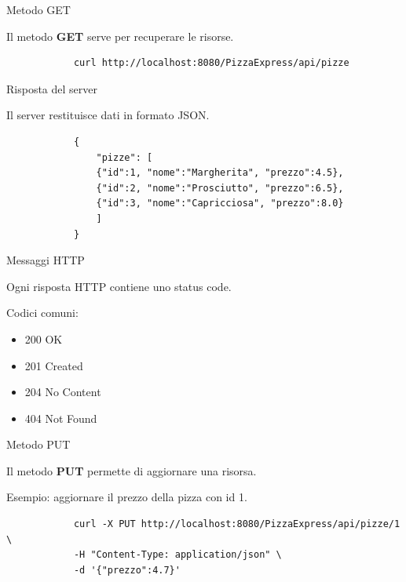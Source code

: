 \documentclass{beamer}
\begin{document}
	\begin{frame}[fragile]{Metodo GET}
		
		Il metodo \textbf{GET} serve per recuperare le risorse.
		
		\bigskip
		
		\begin{lstlisting}
			curl http://localhost:8080/PizzaExpress/api/pizze
		\end{lstlisting}
		
	\end{frame}
	
	
	\begin{frame}[fragile]{Risposta del server}
		
		Il server restituisce dati in formato JSON.
		
		\begin{lstlisting}
			{
				"pizze": [
				{"id":1, "nome":"Margherita", "prezzo":4.5},
				{"id":2, "nome":"Prosciutto", "prezzo":6.5},
				{"id":3, "nome":"Capricciosa", "prezzo":8.0}
				]
			}
		\end{lstlisting}
		
	\end{frame}
	
	
	\begin{frame}{Messaggi HTTP}
		
		Ogni risposta HTTP contiene uno status code.
		
		\bigskip
		
		Codici comuni:
		
		\begin{itemize}
			\item 200 OK
			\item 201 Created
			\item 204 No Content
			\item 404 Not Found
		\end{itemize}
		
	\end{frame}
	
	
	\begin{frame}[fragile]{Metodo PUT}
		
		Il metodo \textbf{PUT} permette di aggiornare una risorsa.
		
		Esempio: aggiornare il prezzo della pizza con id 1.
		
		\begin{lstlisting}
			curl -X PUT http://localhost:8080/PizzaExpress/api/pizze/1 \
			-H "Content-Type: application/json" \
			-d '{"prezzo":4.7}'
		\end{lstlisting}
		
	\end{frame}
	
\end{document}

